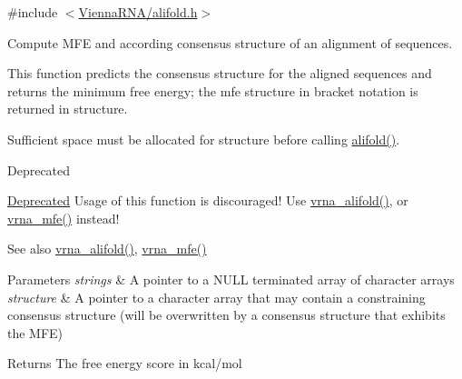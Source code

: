 {\ttfamily \#include $<$\hyperlink{alifold_8h}{Vienna\+R\+N\+A/alifold.\+h}$>$}



Compute M\+FE and according consensus structure of an alignment of sequences. 

This function predicts the consensus structure for the aligned \textquotesingle{}sequences\textquotesingle{} and returns the minimum free energy; the mfe structure in bracket notation is returned in \textquotesingle{}structure\textquotesingle{}.

Sufficient space must be allocated for \textquotesingle{}structure\textquotesingle{} before calling \hyperlink{group__consensus__mfe__fold_ga4cf00f0659e5f0480335d69e797f05b1}{alifold()}.

\begin{DoxyRefDesc}{Deprecated}
\item[\hyperlink{deprecated__deprecated000012}{Deprecated}]Usage of this function is discouraged! Use \hyperlink{group__consensus__mfe__fold_ga6c9d3bef3e92c6d423ffac9f981418c1}{vrna\+\_\+alifold()}, or \hyperlink{group__mfe__fold_gabd3b147371ccf25c577f88bbbaf159fd}{vrna\+\_\+mfe()} instead! \end{DoxyRefDesc}
\begin{DoxySeeAlso}{See also}
\hyperlink{group__consensus__mfe__fold_ga6c9d3bef3e92c6d423ffac9f981418c1}{vrna\+\_\+alifold()}, \hyperlink{group__mfe__fold_gabd3b147371ccf25c577f88bbbaf159fd}{vrna\+\_\+mfe()}
\end{DoxySeeAlso}

\begin{DoxyParams}{Parameters}
{\em strings} & A pointer to a N\+U\+LL terminated array of character arrays \\
\hline
{\em structure} & A pointer to a character array that may contain a constraining consensus structure (will be overwritten by a consensus structure that exhibits the M\+FE) \\
\hline
\end{DoxyParams}
\begin{DoxyReturn}{Returns}
The free energy score in kcal/mol 
\end{DoxyReturn}
\mbox{\label{group__consensus__mfe__fold_gadbd3b0b1c144cbfb4efe704b2b260f96}} 
